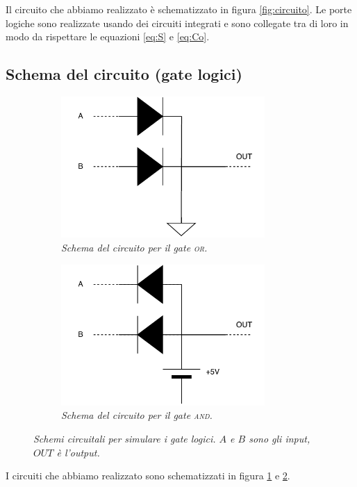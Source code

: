 Il circuito che abbiamo realizzato è schematizzato in figura \ref{fig:circuito}.
Le porte logiche sono realizzate usando dei circuiti integrati e sono collegate tra di loro
in modo da rispettare le equazioni \eqref{eq:S} e \ref{eq:Co}.

\subsection{Schema del circuito (gate logici)}\label{subsec:schema-circuito-gate}
\begin{figure}[h]
  \begin{subfigure}[t]{.47\textwidth}
    \includegraphics[width=7.75cm]{../assets/or.drawio.pdf}
    \caption{
      \emph{
        Schema del circuito per il gate \textsc{or}.
      }
    }
    \label{fig:or-gate}
  \end{subfigure}
  \hspace{5mm}
  \begin{subfigure}[t]{.47\textwidth}
    \includegraphics[width=7.75cm]{../assets/and.drawio.pdf}
    \caption{
      \emph{
        Schema del circuito per il gate \textsc{and}.
      }
    }
    \label{fig:and-gate}
  \end{subfigure}
  \caption{\emph{Schemi circuitali per simulare i gate logici. $A$ e $B$ sono gli input, $OUT$ è l'output.}}
  \label{fig:circuiti-gate}
\end{figure}

I circuiti che abbiamo realizzato sono schematizzati in figura \ref{fig:or-gate} e \ref{fig:and-gate}.

